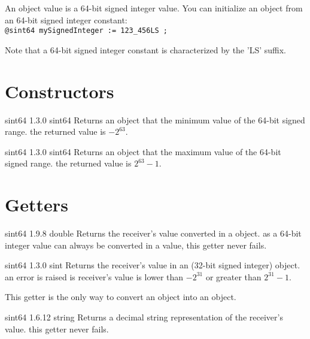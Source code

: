 

An  object value is a 64-bit signed integer value. You can initialize an  object from an 64-bit signed integer constant:\\

\texttt{@sint64 mySignedInteger := 123\_456LS ;}

Note that a 64-bit signed integer constant is characterized by the 'LS' suffix.

\section{Constructors}


{sint64}
{1.3.0}
{sint64}
{Returns an  object that the minimum value of the 64-bit signed range.}
{the returned value is $-2^{63}$.}





{sint64}
{1.3.0}
{sint64}
{Returns an  object that the maximum value of the 64-bit signed range.}
{the returned value is $2^{63}-1$.}


\section{Getters}


{sint64}
{1.9.8}
{double}
{Returns the receiver's value converted in a  object.}
{as a 64-bit integer value can always be converted in a  value, this getter never fails.}




{sint64}
{1.3.0}
{sint}
{Returns the receiver's value in an  (32-bit signed integer) object.}
{an error is raised is receiver's value is lower than $-2^{31}$ or greater than $2^{31}-1$.}

This getter is the only way to convert an  object into an  object.





{sint64}
{1.6.12}
{string}
{Returns a decimal string representation of the receiver's value.}
{this getter never fails.}








